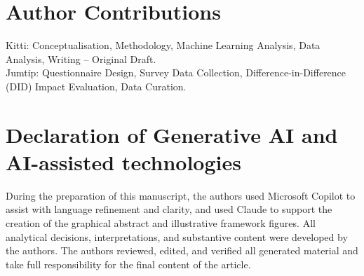 \documentclass[3p,twocolumn,authoryear]{elsarticle}
\begin{document}
\section*{Author Contributions}
Kitti: Conceptualisation, Methodology, Machine Learning Analysis, Data Analysis,
Writing -- Original Draft.\\
Jumtip: Questionnaire Design, Survey Data Collection, Difference-in-Difference
(DID) Impact Evaluation, Data Curation.

\section*{Declaration of Generative AI and AI-assisted technologies}
During the preparation of this manuscript, the authors used Microsoft Copilot to
assist with language refinement and clarity, and used Claude to support the
creation of the graphical abstract and illustrative framework figures. All
analytical decisions, interpretations, and substantive content were developed by
the authors. The authors reviewed, edited, and verified all generated material
and take full responsibility for the final content of the article.
\end{document}
